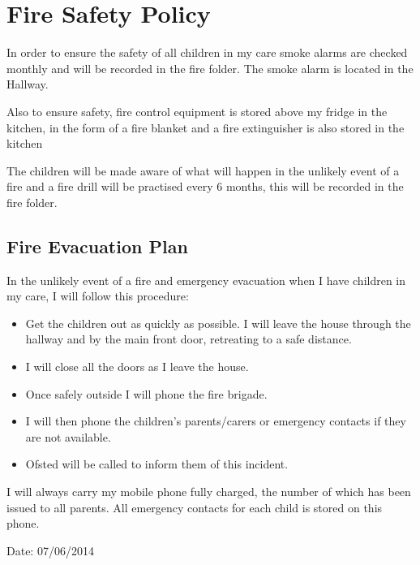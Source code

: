 
\section{Fire Safety Policy}

In order to ensure the safety of all children in my care smoke alarms
are checked monthly and will be recorded in the fire folder. The smoke
alarm is located in the Hallway.

Also to ensure safety, fire control equipment is stored above my fridge
in the kitchen, in the form of a fire blanket and a fire extinguisher is
also stored in the kitchen

The children will be made aware of what will happen in the unlikely
event of a fire and a fire drill will be practised every 6 months, this
will be recorded in the fire folder.

\subsection{Fire Evacuation Plan}

In the unlikely event of a fire and emergency evacuation when I have
children in my care, I will follow this procedure:

\begin{itemize}
\item
  Get the children out as quickly as possible. I will leave the house
  through the hallway and by the main front door, retreating to a safe
  distance.
\item
  I will close all the doors as I leave the house.
\item
  Once safely outside I will phone the fire brigade.
\item
  I will then phone the children's parents/carers or emergency contacts
  if they are not available.
\item
  Ofsted will be called to inform them of this incident.
\end{itemize}

I will always carry my mobile phone fully charged, the number of which
has been issued to all parents. All emergency contacts for each child is
stored on this phone.

Date: 07/06/2014


